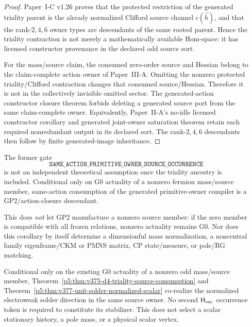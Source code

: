 \documentclass[12pt,a4paper]{article}
\begin{document}
\begin{proof}
Paper~I-C v1.26 proves that the protected restriction of the generated
triality parent is the already normalized Clifford source channel
\(c(\hat h)\), and that the rank-\(2,4,6\) owner types are descendants of the
same rooted parent.  Hence the triality contraction is not merely a
mathematically available Hom-space: it has licensed constructor provenance in
the declared odd source sort.

For the mass/source claim, the consumed zero-order source and Hessian belong to
the claim-complete action owner of Paper~III-A.  Omitting the nonzero protected
triality/Clifford contraction changes that consumed source/Hessian.  Therefore
it is not in the collectively invisible omitted sector.  The generated-action
constructor closure theorem forbids deleting a generated source port from the
same claim-complete owner.  Equivalently, Paper~II-A's no-idle licensed
constructor corollary and generated joint-owner saturation theorem retain each
required nonredundant output in its declared sort.  The rank-\(2,4,6\)
descendants then follow by finite generated-image inheritance.
\end{proof}

\begin{corollary}
\label{p5:cor:v375-g15-source-occurrence-retired}
The former gate
\[
 \texttt{SAME\_ACTION\_PRIMITIVE\_OWNER\_SOURCE\_OCCURRENCE}
\]
is not an independent theoretical assumption once the triality ancestry is
included.  Conditional only on G0 actuality of a nonzero fermion mass/source
member, same-action consumption of the generated primitive-owner compiler is a
GP2/action-closure descendant.

This does \emph{not} let GP2 manufacture a nonzero source member: if the zero
member is compatible with all frozen relations, nonzero actuality remains G0.
Nor does this corollary by itself determine a dimensionful mass normalization,
a noncentral family eigenframe/CKM or PMNS matrix, CP state/measure, or pole/RG
matching.
\end{corollary}

\begin{corollary}
\label{p5:cor:v377-no-independent-ew-vacuum-token}
Conditional only on the existing G0 actuality of a nonzero odd mass/source
member, Theorem~\ref{p5:thm:v375-d4-triality-source-consumption} and
Theorem~\ref{p5:thm:v377-unit-solder-normalized-scalar} co-realize the
normalized electroweak solder direction in the same source owner.  No second
\(\mathsf H_{\rm vac}\) occurrence token is required to constitute its
stabilizer.  This does not select a scalar stationary history, a pole mass, or
a physical scalar vertex.
\end{corollary}
\end{document}
